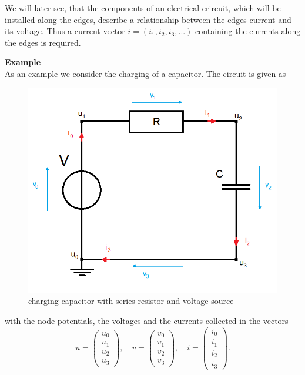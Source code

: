 We will later see, that the components of an electrical crircuit, which will be installed along the edges, describe a relationship between the edges current and its voltage. Thus a current vector $i = (i_1, i_2, i_3, ...)$ containing the currents along the edges is required.


\textbf{Example} \label{ex:network topology} \\
As an example we consider the charging of a capacitor. The circuit is given as
\begin{figure}[H]
	\label{circuit:charging of capacitor}
	\centering
	\includegraphics[scale=0.5]{pictures/Example1_simple.png}
	\caption{charging capacitor with series resistor and voltage source}
\end{figure}
with the node-potentials, the voltages and the currents collected in the vectors
\begin{displaymath}
	u=
	\left(
	\begin{matrix}
		u_0 \\
		u_1 \\
		u_2 \\
		u_3 
	\end{matrix}
	\right),
	\quad
	v=
	\left(
	\begin{matrix}
		v_0 \\
		v_1 \\
		v_2 \\
		v_3 
	\end{matrix}
	\right),
	\quad
	i=
	\left(
	\begin{matrix}
		i_0 \\
		i_1 \\
		i_2 \\
		i_3 
	\end{matrix}
	\right).
\end{displaymath}
